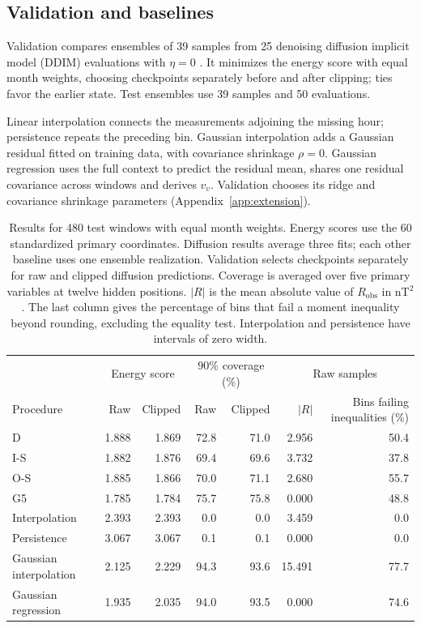 \documentclass{article}
\begin{document}
\subsection{Validation and baselines}

 Validation compares ensembles of 39 samples from 25 denoising diffusion implicit model (DDIM) evaluations with $\eta=0$ \citep{song2021ddim}. It minimizes the energy score with equal month weights, choosing checkpoints separately before and after clipping; ties favor the earlier state. Test ensembles use 39 samples and 50 evaluations.

Linear interpolation connects the measurements adjoining the missing hour; persistence repeats the preceding bin. Gaussian interpolation adds a Gaussian residual fitted on training data, with covariance shrinkage $\rho=0$. Gaussian regression uses the full context to predict the residual mean, shares one residual covariance across windows and derives $v_v$. Validation chooses its ridge and covariance shrinkage parameters (Appendix~\ref{app:extension}).

\begin{table}[!htbp]
\centering
\caption{Results for 480 test windows with equal month weights. Energy scores use the 60 standardized primary coordinates. Diffusion results average three fits; each other baseline uses one ensemble realization. Validation selects checkpoints separately for raw and clipped diffusion predictions. Coverage is averaged over five primary variables at twelve hidden positions. $|R|$ is the mean absolute value of $R_{\mathrm{obs}}$ in nT$^2$. The last column gives the percentage of bins that fail a moment inequality beyond rounding, excluding the equality test. Interpolation and persistence have intervals of zero width.}
\label{tab:main}
\begin{tabular}{lrrrrrr}
\toprule
 & \multicolumn{2}{c}{Energy score} & \multicolumn{2}{c}{90\% coverage (\%)} & \multicolumn{2}{c}{Raw samples} \\
Procedure & Raw & Clipped & Raw & Clipped & $|R|$ & \parbox[c]{19mm}{\centering Bins failing inequalities (\%)} \\
\midrule
D & 1.888 & 1.869 & 72.8 & 71.0 & 2.956 & 50.4 \\
I-S & 1.882 & 1.876 & 69.4 & 69.6 & 3.732 & 37.8 \\
O-S & 1.885 & 1.866 & 70.0 & 71.1 & 2.680 & 55.7 \\
G5 & 1.785 & 1.784 & 75.7 & 75.8 & 0.000 & 48.8 \\
Interpolation & 2.393 & 2.393 & 0.0 & 0.0 & 3.459 & 0.0 \\
Persistence & 3.067 & 3.067 & 0.1 & 0.1 & 0.000 & 0.0 \\
Gaussian interpolation & 2.125 & 2.229 & 94.3 & 93.6 & 15.491 & 77.7 \\
Gaussian regression & 1.935 & 2.035 & 94.0 & 93.5 & 0.000 & 74.6 \\
\bottomrule
\end{tabular}
\end{table}
\end{document}
